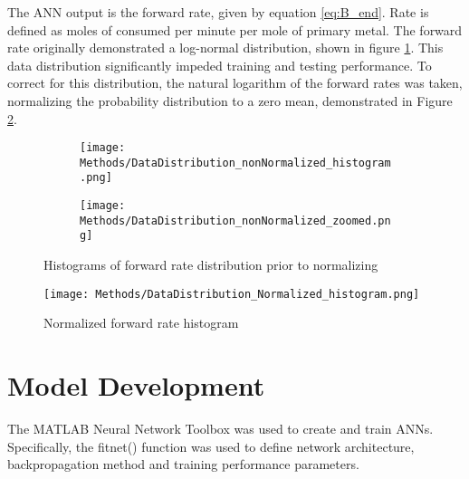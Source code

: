 The ANN output is the forward rate, given by equation \ref{eq:B_end}. Rate is defined as moles of  consumed per minute per mole of primary metal. The forward rate originally demonstrated a log-normal distribution, shown in figure \ref{fig:non-norm_dist}. This data distribution significantly impeded training and testing performance. To correct for this distribution, the natural logarithm of the forward rates was taken, normalizing the probability distribution to a zero mean, demonstrated in Figure \ref{fig:norm_dist}.
\begin{figure}[ht]
    \centering{}
    \begin{subfigure}[b]{0.48\textwidth}
        \centering
        \texttt{[image: Methods/DataDistribution\_nonNormalized\_histogram.png]}
    	\end{subfigure}
    \begin{subfigure}[b]{0.48\textwidth}
        \centering
        \texttt{[image: Methods/DataDistribution\_nonNormalized\_zoomed.png]}
    	\end{subfigure}
    \caption{Histograms of forward rate distribution prior to normalizing}
    \label{fig:non-norm_dist}
	\end{figure}

\begin{figure}[ht]
	    \centering
        \texttt{[image: Methods/DataDistribution\_Normalized\_histogram.png]}
        \caption{Normalized forward rate histogram}
        \label{fig:norm_dist}
		\end{figure}

\section{Model Development}
The MATLAB Neural Network Toolbox was used to create and train ANNs. Specifically, the fitnet() function was used to define network architecture, backpropagation method and training performance parameters.

